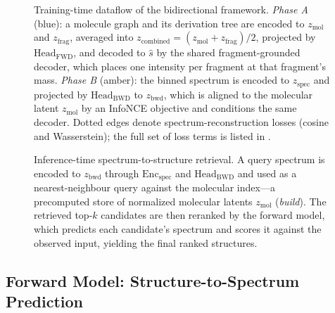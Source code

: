 \begin{figure}[H]
    \centering
    \resizebox{\textwidth}{!}{
        
    }
    \caption[Training dataflow]{
        Training-time dataflow of the bidirectional framework.
        \emph{Phase A} (blue): a molecule graph and its derivation tree are encoded to $z_{\mathrm{mol}}$ and $z_{\mathrm{frag}}$, averaged into $z_{\mathrm{combined}}=(z_{\mathrm{mol}}+z_{\mathrm{frag}})/2$, projected by $\text{Head}_{\mathrm{FWD}}$, and decoded to $\hat{s}$ by the shared fragment-grounded decoder, which places one intensity per fragment at that fragment's mass.
        \emph{Phase B} (amber): the binned spectrum is encoded to $z_{\mathrm{spec}}$ and projected by $\text{Head}_{\mathrm{BWD}}$ to $z_{\mathrm{bwd}}$, which is aligned to the molecular latent $z_{\mathrm{mol}}$ by an InfoNCE objective and conditions the same decoder.
        Dotted edges denote spectrum-reconstruction losses (cosine and Wasserstein); the full set of loss terms is listed in .
    }
    \label{fig:ml-architecture-training}
\end{figure}

\begin{figure}[H]
    \centering
    \resizebox{\textwidth}{!}{
        
    }
    \caption[Inference and retrieval]{
        Inference-time spectrum-to-structure retrieval.
        A query spectrum is encoded to $z_{\mathrm{bwd}}$ through $\text{Enc}_{\mathrm{spec}}$ and $\text{Head}_{\mathrm{BWD}}$ and used as a nearest-neighbour query against the molecular index---a precomputed store of normalized molecular latents $z_{\mathrm{mol}}$ (\emph{build}).
        The retrieved top-$k$ candidates are then reranked by the forward model, which predicts each candidate's spectrum and scores it against the observed input, yielding the final ranked structures.
    }
    \label{fig:ml-architecture-inference}
\end{figure}




\subsection{Forward Model: Structure-to-Spectrum Prediction}
\label{sec:forward-model}

